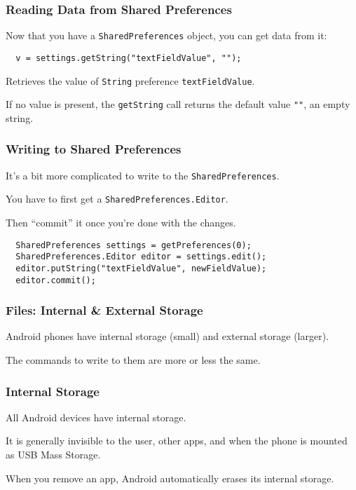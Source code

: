 \begin{frame}[fragile]
\frametitle{Reading Data from Shared Preferences}
\begin{changemargin}{1cm}
Now that you have a {\tt SharedPreferences} object, you can get data from it:

\begin{verbatim}
  v = settings.getString("textFieldValue", "");
\end{verbatim}
Retrieves the value of {\tt String} preference {\tt textFieldValue}. 
  
  If no value is present, the {\tt getString} call
returns the default value {\tt ""}, an empty string.

\end{changemargin}
\end{frame}


\begin{frame}[fragile]
\frametitle{Writing to Shared Preferences}
\begin{changemargin}{1cm}

It's a bit more complicated to write to the {\tt SharedPreferences}.

You have to first get a {\tt SharedPreferences.Editor}.

Then ``commit'' it once you're done with the changes.

\begin{verbatim}
  SharedPreferences settings = getPreferences(0);
  SharedPreferences.Editor editor = settings.edit();
  editor.putString("textFieldValue", newFieldValue);
  editor.commit();
\end{verbatim}


\end{changemargin}
\end{frame}


\begin{frame}
\frametitle{Files: Internal \& External Storage}

\begin{changemargin}{1cm}
Android phones have internal storage (small) and external storage
(larger).

The commands to write to them are more or less the same.

\end{changemargin}
\end{frame}

\begin{frame}
\frametitle{Internal Storage}
\begin{changemargin}{1cm}

All Android devices have internal storage. 

It is generally
invisible to the user, other apps, and when the phone is mounted as
USB Mass Storage. 

When you remove an app, Android automatically
erases its internal storage. 

\end{changemargin}
\end{frame}

